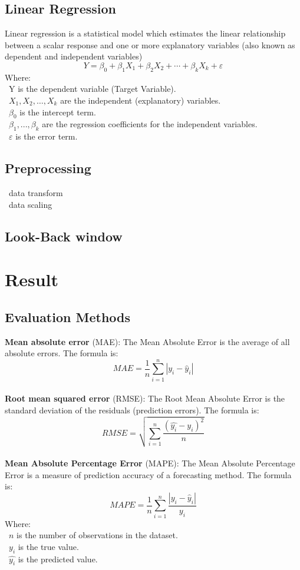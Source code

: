 \documentclass{ieeeojies}
\begin{document}
\subsection{Linear Regression}
 Linear regression is a statistical model which estimates the linear relationship between a scalar response and one or more explanatory variables (also known as dependent and independent variables)
 \[Y=\beta_0+\beta_1X_1+\beta_2X_2+\cdots+\beta_kX_k+\varepsilon\]
Where:\\
	\indent\textbullet\ Y is the dependent variable (Target Variable).\\
	\indent\textbullet\ \(X_1, X_2, \ldots, X_k\) are the independent (explanatory) variables.\\
	\indent\textbullet\ \(\beta_0\) is the intercept term.\\
	\indent\textbullet\ \(\beta_1,..., \beta_k\) are the regression coefficients for the independent variables.\\
	\indent\textbullet\ \(\varepsilon\) is the error term.
 \subsection{Preprocessing}
 \textbullet\ data transform \\
 \textbullet\ data scaling
 \subsection{Look-Back window}
\section{Result}

\subsection{Evaluation Methods}
\textbf{Mean absolute error} (MAE): 
The Mean Absolute Error is the average of all absolute errors. The formula is:\\
\[MAE = \frac{1}{n} \sum_{i=1}^{n} | y_i - \hat{y}_i |\]\\
  
\textbf{Root mean squared error} (RMSE): The Root Mean Absolute Error is the standard deviation of the residuals (prediction errors). The formula is: \\
\[RMSE=\sqrt{\sum_{i=1}^{n} \frac{(\hat{y_i}-y_i )^2}{n} }\]\\
\textbf{Mean Absolute Percentage Error} (MAPE): The Mean Absolute Percentage Error is a measure of prediction accuracy of a forecasting method. The formula is:  \\
\[MAPE=\frac{1}{n}\sum_{i=1}^{n} \frac{|y_i-\hat{y}_i|}{y_i}\]
Where: \\
	\indent\textbullet\ \(n\) is the number of observations in the dataset.\\
	\indent\textbullet\ \(y_i\)  is the true value.\\
	\indent\textbullet\ \(\hat{y_i}\) is the predicted value.
\end{document}
